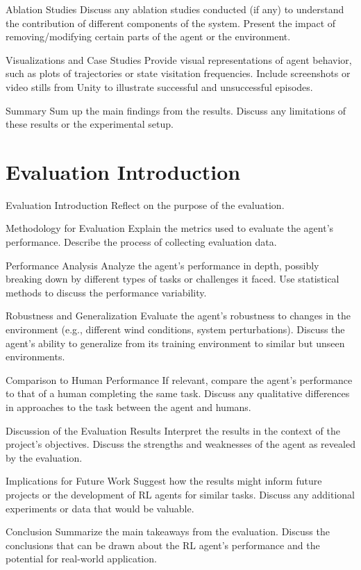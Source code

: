 Ablation Studies
Discuss any ablation studies conducted (if any) to understand the contribution of different components of the system.
Present the impact of removing/modifying certain parts of the agent or the environment.

Visualizations and Case Studies
Provide visual representations of agent behavior, such as plots of trajectories or state visitation frequencies.
Include screenshots or video stills from Unity to illustrate successful and unsuccessful episodes.

Summary
Sum up the main findings from the results.
Discuss any limitations of these results or the experimental setup.


\section{Evaluation Introduction}
Evaluation
Introduction
Reflect on the purpose of the evaluation.

Methodology for Evaluation
Explain the metrics used to evaluate the agent’s performance.
Describe the process of collecting evaluation data.

Performance Analysis
Analyze the agent’s performance in depth, possibly breaking down by different types of tasks or challenges it faced.
Use statistical methods to discuss the performance variability.

Robustness and Generalization
Evaluate the agent's robustness to changes in the environment (e.g., different wind conditions, system perturbations).
Discuss the agent's ability to generalize from its training environment to similar but unseen environments.

Comparison to Human Performance
If relevant, compare the agent’s performance to that of a human completing the same task.
Discuss any qualitative differences in approaches to the task between the agent and humans.

Discussion of the Evaluation Results
Interpret the results in the context of the project's objectives.
Discuss the strengths and weaknesses of the agent as revealed by the evaluation.

Implications for Future Work
Suggest how the results might inform future projects or the development of RL agents for similar tasks.
Discuss any additional experiments or data that would be valuable.

Conclusion
Summarize the main takeaways from the evaluation.
Discuss the conclusions that can be drawn about the RL agent's performance and the potential for real-world application.

